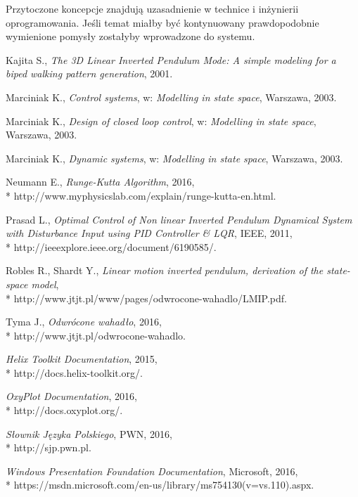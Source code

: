 \documentclass[12pt, oneside]{report}
\theoremstyle{definition}
\begin{document}
Przytoczone koncepcje znajdują uzasadnienie w technice i inżynierii oprogramowania. Jeśli temat miałby być kontynuowany prawdopodobnie wymienione pomysły zostałyby wprowadzone do systemu.
	
\pagestyle{plain}
\begin{thebibliography}{11}

Kajita S., 
\emph{The 3D Linear Inverted Pendulum Mode: A simple modeling for a biped walking pattern generation}, 
2001.

Marciniak K., 
\emph{Control systems}, 
w: \emph{Modelling in state space}, 
Warszawa, 2003.

Marciniak K., 
\emph{Design of closed loop control}, 
w: \emph{Modelling in state space}, 
Warszawa, 2003.

Marciniak K., 
\emph{Dynamic systems}, 
w: \emph{Modelling in state space}, 
Warszawa, 2003.

Neumann E., 
\emph{Runge-Kutta Algorithm}, 
2016,
\\*
http://www.myphysicslab.com/explain/runge-kutta-en.html.

Prasad L., 
\emph{Optimal Control of Non linear Inverted Pendulum Dynamical System with Disturbance Input using PID Controller \& LQR}, 
IEEE, 2011,
\\*
http://ieeexplore.ieee.org/document/6190585/.

Robles R., Shardt Y., 
\emph{Linear motion inverted pendulum, derivation of the state-space model},
\\*
http://www.jtjt.pl/www/pages/odwrocone-wahadlo/LMIP.pdf.

 Tyma J., 
\emph{Odwrócone wahadło},
2016,
\\*
http://www.jtjt.pl/odwrocone-wahadlo.

\emph{Helix Toolkit Documentation}, 
2015,
\\*
http://docs.helix-toolkit.org/.

\emph{OxyPlot Documentation}, 
2016,
\\*
http://docs.oxyplot.org/.

\emph{Słownik Języka Polskiego}, 
PWN, 2016,
\\*
http://sjp.pwn.pl.

\emph{Windows Presentation Foundation Documentation}, 
Microsoft, 2016,
\\*
https://msdn.microsoft.com/en-us/library/ms754130(v=vs.110).aspx.


\end{thebibliography}
\end{document}

